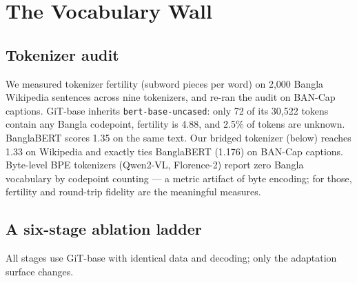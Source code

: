 \documentclass[11pt]{article}
\begin{document}
\section{The Vocabulary Wall}
\label{sec:vocab}

\subsection{Tokenizer audit}

We measured tokenizer fertility (subword pieces per word) on 2{,}000
Bangla Wikipedia sentences across nine tokenizers, and re-ran the audit
on BAN-Cap captions. GiT-base \cite{git2022} inherits
\texttt{bert-base-uncased}: only 72 of its 30{,}522 tokens contain any
Bangla codepoint, fertility is 4.88, and 2.5\% of tokens are unknown.
BanglaBERT \cite{banglabert2022} scores 1.35 on the same text. Our
bridged tokenizer (below) reaches 1.33 on Wikipedia and exactly ties
BanglaBERT (1.176) on BAN-Cap captions. Byte-level BPE tokenizers
(Qwen2-VL, Florence-2) report zero Bangla vocabulary by codepoint
counting --- a metric artifact of byte encoding; for those, fertility
and round-trip fidelity are the meaningful measures.

\subsection{A six-stage ablation ladder}

All stages use GiT-base with identical data and decoding; only the
adaptation surface changes.
\end{document}

